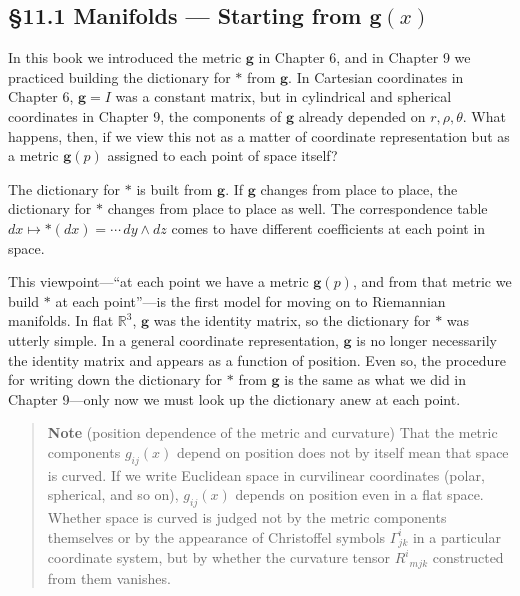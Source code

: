\hypertarget{manifolds-starting-from-mathbfgx}{%
\subsection{\texorpdfstring{§11.1 Manifolds --- Starting from
\(\mathbf{g}(x)\)}{§11.1 Manifolds --- Starting from \textbackslash mathbf\{g\}(x)}}\label{manifolds-starting-from-mathbfgx}}

In this book we introduced the metric \(\mathbf{g}\) in Chapter 6, and
in Chapter 9 we practiced building the dictionary for \(\ast\) from
\(\mathbf{g}\). In Cartesian coordinates in Chapter 6,
\(\mathbf{g} = I\) was a constant matrix, but in cylindrical and
spherical coordinates in Chapter 9, the components of \(\mathbf{g}\)
already depended on \(r, \rho, \theta\). What happens, then, if we view
this not as a matter of coordinate representation but as a metric
\(\mathbf{g}(p)\) assigned to each point of space itself?

The dictionary for \(\ast\) is built from \(\mathbf{g}\). If
\(\mathbf{g}\) changes from place to place, the dictionary for \(\ast\)
changes from place to place as well. The correspondence table
\(dx \mapsto \ast(dx) = \cdots\, dy \wedge dz\) comes to have different
coefficients at each point in space.

This viewpoint---``at each point we have a metric \(\mathbf{g}(p)\), and
from that metric we build \(\ast\) at each point''---is the first model
for moving on to Riemannian manifolds. In flat \(\mathbb{R}^3\),
\(\mathbf{g}\) was the identity matrix, so the dictionary for \(\ast\)
was utterly simple. In a general coordinate representation,
\(\mathbf{g}\) is no longer necessarily the identity matrix and appears
as a function of position. Even so, the procedure for writing down the
dictionary for \(\ast\) from \(\mathbf{g}\) is the same as what we did
in Chapter 9---only now we must look up the dictionary anew at each
point.

\begin{quote}
\textbf{Note} (position dependence of the metric and curvature) That the
metric components \(g_{ij}(x)\) depend on position does not by itself
mean that space is curved. If we write Euclidean space in curvilinear
coordinates (polar, spherical, and so on), \(g_{ij}(x)\) depends on
position even in a flat space. Whether space is curved is judged not by
the metric components themselves or by the appearance of Christoffel
symbols \(\Gamma^i_{jk}\) in a particular coordinate system, but by
whether the curvature tensor \(R^i{}_{mjk}\) constructed from them
vanishes.
\end{quote}

